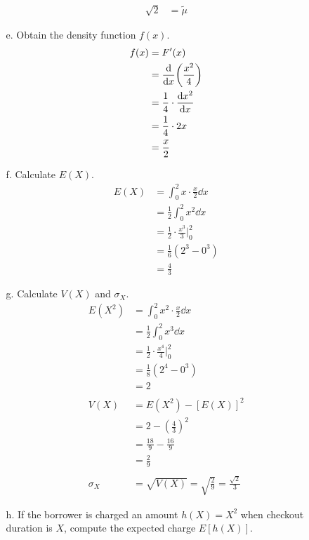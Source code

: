 \documentclass[letterpaper,12pt]{article}
\begin{document}
\begin{enumerate}
\begin{enumerate}
\begin{align*}
          \sqrt{2} &= \tilde{\mu}
        \end{align*}
      \item[e.]
        Obtain the density function $f(x)$.
        \begin{align*}
          f(x) &= F^\prime(x) \\
          &= \dv{x}(\frac{x^2}{4}) \\
          &= \frac{1}{4} \cdot \dv{x^2}{x} \\
          &= \frac{1}{4} \cdot 2x \\
          &= \frac{x}{2}
        \end{align*}
      \item[f.]
        Calculate $E(X)$.
        \begin{align*}
          E(X) &= \int_{0}^{2} x \cdot \frac{x}{2} \dd{x} \\
          &= \frac{1}{2} \int_{0}^{2} x^2 \dd{x} \\
          &= \frac{1}{2} \cdot \frac{x^3}{3} \bigg\rvert_{0}^{2} \\
          &= \frac{1}{6}(2^3 - 0^3) \\
          &= \frac{4}{3}
        \end{align*}
      \item[g.]
        Calculate $V(X)$ and $\sigma_X$.
        \begin{align*}
          E(X^2) &= \int_{0}^{2} x^2 \cdot \frac{x}{2} \dd{x} \\
          &= \frac{1}{2} \int_{0}^{2} x^3 \dd{x} \\
          &= \frac{1}{2} \cdot \frac{x^4}{4} \bigg\rvert_{0}^{2} \\
          &= \frac{1}{8}(2^4 - 0^3) \\
          &= 2 \\
          \\
          V(X) &= E(X^2) - [E(X)]^2 \\
          &= 2 - \left(\frac{4}{3}\right)^2 \\
          &= \frac{18}{9} - \frac{16}{9} \\
          &= \frac{2}{9} \\
          \\
          \sigma_X &= \sqrt{V(X)} = \sqrt{\frac{2}{9}} = \frac{\sqrt{2}}{3}
        \end{align*}
      \item[h.]
        If the borrower is charged an amount $h(X) = X^2$ when checkout duration is $X$, compute the expected charge $E[h(X)]$.

\end{enumerate}
\end{enumerate}
\end{document}
